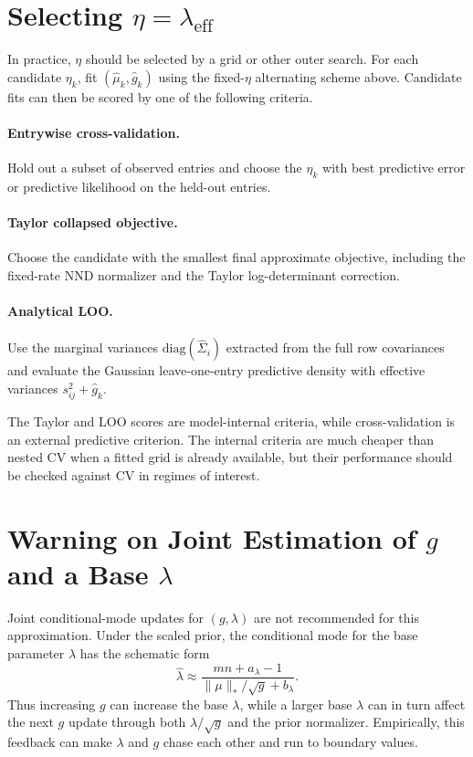 \documentclass[11pt]{article}
\begin{document}
\section{Selecting $\eta=\lambda_{\mathrm{eff}}$}

In practice, $\eta$ should be selected by a grid or other outer search.  For
each candidate $\eta_k$, fit $(\hat\mu_k,\hat g_k)$ using the fixed-$\eta$
alternating scheme above.  Candidate fits can then be scored by one of the
following criteria.

\paragraph{Entrywise cross-validation.}
Hold out a subset of observed entries and choose the $\eta_k$ with best
predictive error or predictive likelihood on the held-out entries.

\paragraph{Taylor collapsed objective.}
Choose the candidate with the smallest final approximate objective, including
the fixed-rate NND normalizer and the Taylor log-determinant correction.

\paragraph{Analytical LOO.}
Use the marginal variances $\mathrm{diag}(\hat\Sigma_i)$ extracted from the full
row covariances and evaluate the Gaussian leave-one-entry predictive density
with effective variances $s_{ij}^2+\hat g_k$.

The Taylor and LOO scores are model-internal criteria, while cross-validation
is an external predictive criterion.  The internal criteria are much cheaper
than nested CV when a fitted grid is already available, but their performance
should be checked against CV in regimes of interest.

\section{Warning on Joint Estimation of $g$ and a Base $\lambda$}

Joint conditional-mode updates for $(g,\lambda)$ are not recommended for this
approximation.  Under the scaled prior, the conditional mode for the base
parameter $\lambda$ has the schematic form
\begin{equation}
    \hat\lambda
        \approx
        \frac{mn + a_\lambda - 1}
             {\|\mu\|_*/\sqrt{g} + b_\lambda}.
\end{equation}
Thus increasing $g$ can increase the base $\lambda$, while a larger base
$\lambda$ can in turn affect the next $g$ update through both
$\lambda/\sqrt{g}$ and the prior normalizer.  Empirically, this feedback can
make $\lambda$ and $g$ chase each other and run to boundary values.
\end{document}
